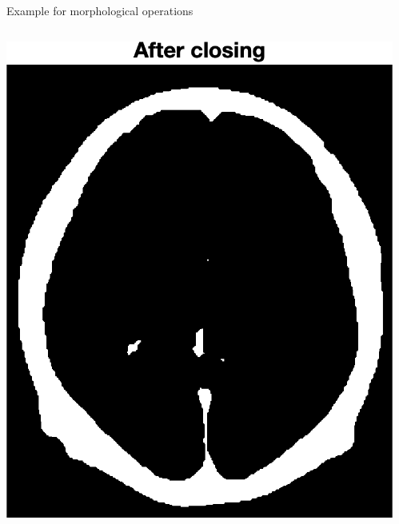 \begin{frame}{Example for morphological operations}
\begin{columns}[onlytextwidth,T]
\begin{column}{0.30\textwidth}
            \includegraphics[height=0.60\textheight]{images/brain_t200_1_closed.png}
         \end{column}
         \begin{column}{0.30\textwidth}
            \centering{}

\end{column}
\end{columns}
\end{frame}
